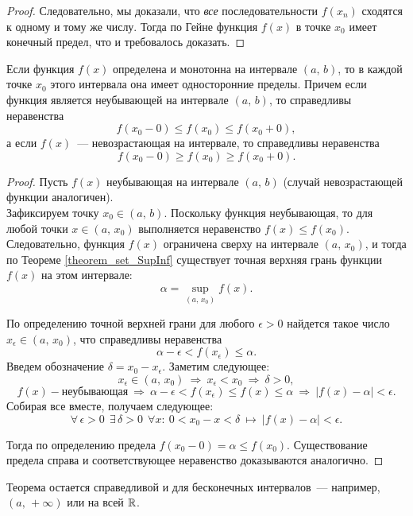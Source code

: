 \begin{theorem}
\begin{proof}
Следовательно, мы доказали, что \textit{все} последовательности \(f(x_{n})\) сходятся
к одному и тому же числу. Тогда по Гейне функция \(f(x)\) в точке \(x_{0}\) имеет
конечный предел, что и требовалось доказать.
\end{proof}
\end{theorem}


\begin{theorem}
\label{theorem_sideLims_monotonous}
Если функция \(f(x)\) определена и монотонна на интервале \((a, \, b)\), то в каждой точке
\(x_{0}\) этого интервала она имеет односторонние пределы. Причем если функция
является неубывающей на интервале \((a, \, b)\), то справедливы неравенства
\[
f(x_{0} - 0) \leq f(x_{0}) \leq f(x_{0} + 0),
\]
а если \(f(x)\)~--- невозрастающая на интервале, то справедливы неравенства
\[
f(x_{0} - 0) \geq f(x_{0}) \geq f(x_{0} + 0).
\]

\begin{proof}
Пусть \(f(x)\) неубывающая на интервале \((a, \, b)\)
(случай невозрастающей функции аналогичен). \\
Зафиксируем точку \(x_{0} \in (a, \, b)\). Поскольку функция неубывающая,
то для любой точки \(x \in (a, \, x_{0})\) выполняется неравенство \(f(x) \leq f(x_{0})\).
Следовательно, функция \(f(x)\) ограничена сверху на интервале \((a, \, x_{0})\), и тогда
по Теореме \ref{theorem_set_SupInf} существует точная верхняя грань функции \(f(x)\)
на этом интервале:
\[
\alpha = \underset{(a, \, x_{0})}{\sup} f(x).
\]

По определению точной верхней грани для любого \(\epsilon > 0\) найдется такое число
\(x_{\epsilon} \in (a, \, x_{0})\), что справедливы неравенства
\[
\alpha - \epsilon < f(x_{\epsilon}) \leq \alpha.
\]
Введем обозначение \(\delta = x_{0} - x_{\epsilon}.\) Заметим следующее:
\[
x_{\epsilon} \in (a, \, x_{0}) ~ \Rightarrow ~ x_{\epsilon} < x_{0} ~ \Rightarrow ~ \delta > 0,
\]
\[
f(x) - \text{неубывающая} ~ \Rightarrow ~ \alpha - \epsilon < f(x_{\epsilon}) \leq f(x) \leq \alpha
~ \Rightarrow ~ |f(x) - \alpha| < \epsilon.
\]
Собирая все вместе, получаем следующее:
\[
\forall \, \epsilon > 0 ~~ \exists \, \delta > 0 ~~ \forall x: ~ 0 < x_{0} - x < \delta
~ \longmapsto ~ |f(x) - \alpha| < \epsilon.
\]

Тогда по определению предела \(f(x_{0} - 0) = \alpha \leq f(x_{0})\).
Существование предела справа и соответствующее неравенство доказываются аналогично.
\end{proof}
\end{theorem}

\begin{note}
Теорема остается справедливой и для бесконечных интервалов~--- например, \((a, \, +\infty)\)
или на всей \(\mathbb{R}\).
\end{note}